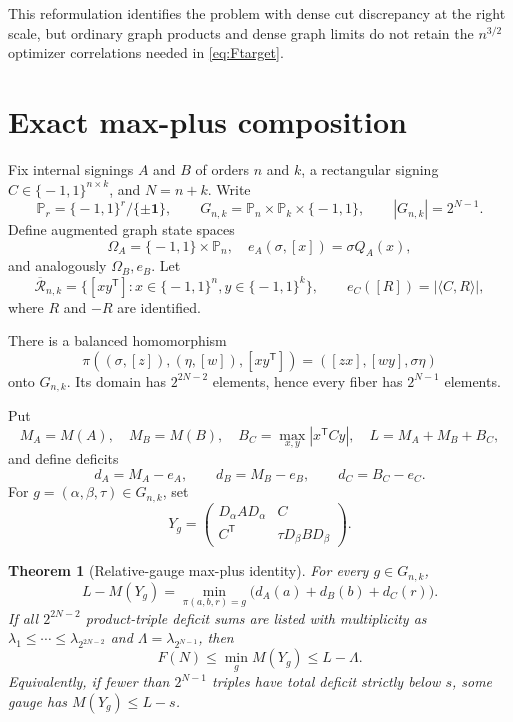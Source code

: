 \documentclass[11pt]{article}
\newcommand{\eps}{\{\!-1,1\!\}}
\newcommand{\PP}{\mathbb P}
\newcommand{\T}{\mathsf T}
\newtheorem{theorem}{Theorem}[section]
\theoremstyle{definition}
\theoremstyle{remark}
\begin{document}
This reformulation identifies the problem with dense cut discrepancy at the
right scale, but ordinary graph products and dense graph limits do not retain
the $n^{3/2}$ optimizer correlations needed in \eqref{eq:Ftarget}.

\section{Exact max-plus composition}

Fix internal signings $A$ and $B$ of orders $n$ and $k$, a rectangular
signing $C\in\eps^{n\times k}$, and $N=n+k$.  Write
\[
 \PP_r=\eps^r/\{\pm\mathbf1\},
 \qquad G_{n,k}=\PP_n\times\PP_k\times\eps,
 \qquad |G_{n,k}|=2^{N-1}.
\]
Define augmented graph state spaces
\[
 \Omega_A=\eps\times\PP_n,
 \quad e_A(\sigma,[x])=\sigma Q_A(x),
\]
and analogously $\Omega_B,e_B$.  Let
\[
 \overline{\mathcal R}_{n,k}
 =\{[xy^{\T}]:x\in\eps^n,y\in\eps^k\},
 \qquad e_C([R])=|\langle C,R\rangle|,
\]
where $R$ and $-R$ are identified.

There is a balanced homomorphism
\begin{equation}
 \pi((\sigma,[z]),(\eta,[w]),[xy^{\T}])
 =([zx],[wy],\sigma\eta)                                \label{eq:pi}
\end{equation}
onto $G_{n,k}$.  Its domain has $2^{2N-2}$ elements, hence every fiber has
$2^{N-1}$ elements.

Put
\[
 M_A=M(A),\quad M_B=M(B),\quad
 B_C=\max_{x,y}|x^{\T}Cy|,\quad L=M_A+M_B+B_C,
\]
and define deficits
\[
 d_A=M_A-e_A,\qquad d_B=M_B-e_B,\qquad d_C=B_C-e_C.
\]
For $g=(\alpha,\beta,\tau)\in G_{n,k}$, set
\[
 Y_g=\begin{pmatrix}
 D_\alpha AD_\alpha&C\\ C^{\T}&\tau D_\beta BD_\beta
 \end{pmatrix}.
\]

\begin{theorem}[Relative-gauge max-plus identity]
\label{thm:maxplus}
For every $g\in G_{n,k}$,
\begin{equation}
 L-M(Y_g)=
 \min_{\pi(a,b,r)=g}\bigl(d_A(a)+d_B(b)+d_C(r)\bigr).   \label{eq:maxplus}
\end{equation}
If all $2^{2N-2}$ product-triple deficit sums are listed with multiplicity as
$\lambda_1\le\cdots\le\lambda_{2^{2N-2}}$ and
$\Lambda=\lambda_{2^{N-1}}$, then
\begin{equation}
 F(N)\le\min_gM(Y_g)\le L-\Lambda.                      \label{eq:scalar-profile}
\end{equation}
Equivalently, if fewer than $2^{N-1}$ triples have total deficit strictly
below $s$, some gauge has $M(Y_g)\le L-s$.
\end{theorem}
\end{document}

